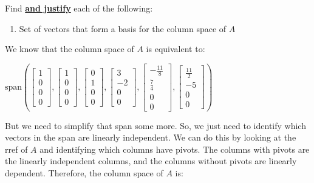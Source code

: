 \documentclass[
  letterpaper,
  DIV=11,
  numbers=noendperiod]{scrartcl}
\providecommand{\tightlist}{%
  \setlength{\itemsep}{0pt}\setlength{\parskip}{0pt}}\usepackage{longtable,booktabs,array}
\begin{document}
Find \ul{\textbf{and justify}} each of the following:

\begin{enumerate}
\def\labelenumi{\alph{enumi}.}
\tightlist
\item
  Set of vectors that form a basis for the column space of \(A\)
\end{enumerate}

We know that the column space of \(A\) is equivalent to:

\(\mathrm{span}\left(\begin{bmatrix}1 \\ 0 \\ 0 \\ 0\end{bmatrix},\begin{bmatrix}1 \\ 0 \\ 0 \\ 0\end{bmatrix},\begin{bmatrix}0\\1\\0\\0\end{bmatrix},\begin{bmatrix}3\\-2\\0\\0\end{bmatrix},\begin{bmatrix}-\frac{11}{8}\\ \frac{7}{4}\\0\\0\end{bmatrix},\begin{bmatrix}\frac{11}{2}\\-5\\0\\0\end{bmatrix}\right)\)

But we need to simplify that span some more. So, we just need to
identify which vectors in the span are linearly independent. We can do
this by looking at the rref of \(A\) and identifying which columns have
pivots. The columns with pivots are the linearly independent columns,
and the columns without pivots are linearly dependent. Therefore, the
column space of \(A\) is:
\end{document}
